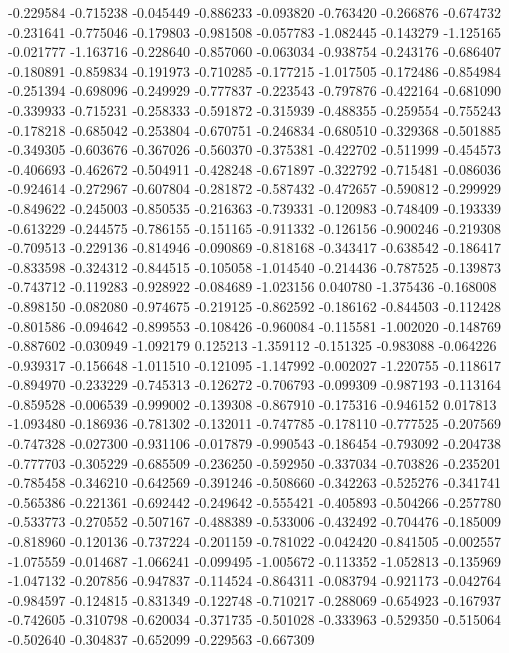 -0.229584
-0.715238
-0.045449
-0.886233
-0.093820
-0.763420
-0.266876
-0.674732
-0.231641
-0.775046
-0.179803
-0.981508
-0.057783
-1.082445
-0.143279
-1.125165
-0.021777
-1.163716
-0.228640
-0.857060
-0.063034
-0.938754
-0.243176
-0.686407
-0.180891
-0.859834
-0.191973
-0.710285
-0.177215
-1.017505
-0.172486
-0.854984
-0.251394
-0.698096
-0.249929
-0.777837
-0.223543
-0.797876
-0.422164
-0.681090
-0.339933
-0.715231
-0.258333
-0.591872
-0.315939
-0.488355
-0.259554
-0.755243
-0.178218
-0.685042
-0.253804
-0.670751
-0.246834
-0.680510
-0.329368
-0.501885
-0.349305
-0.603676
-0.367026
-0.560370
-0.375381
-0.422702
-0.511999
-0.454573
-0.406693
-0.462672
-0.504911
-0.428248
-0.671897
-0.322792
-0.715481
-0.086036
-0.924614
-0.272967
-0.607804
-0.281872
-0.587432
-0.472657
-0.590812
-0.299929
-0.849622
-0.245003
-0.850535
-0.216363
-0.739331
-0.120983
-0.748409
-0.193339
-0.613229
-0.244575
-0.786155
-0.151165
-0.911332
-0.126156
-0.900246
-0.219308
-0.709513
-0.229136
-0.814946
-0.090869
-0.818168
-0.343417
-0.638542
-0.186417
-0.833598
-0.324312
-0.844515
-0.105058
-1.014540
-0.214436
-0.787525
-0.139873
-0.743712
-0.119283
-0.928922
-0.084689
-1.023156
0.040780
-1.375436
-0.168008
-0.898150
-0.082080
-0.974675
-0.219125
-0.862592
-0.186162
-0.844503
-0.112428
-0.801586
-0.094642
-0.899553
-0.108426
-0.960084
-0.115581
-1.002020
-0.148769
-0.887602
-0.030949
-1.092179
0.125213
-1.359112
-0.151325
-0.983088
-0.064226
-0.939317
-0.156648
-1.011510
-0.121095
-1.147992
-0.002027
-1.220755
-0.118617
-0.894970
-0.233229
-0.745313
-0.126272
-0.706793
-0.099309
-0.987193
-0.113164
-0.859528
-0.006539
-0.999002
-0.139308
-0.867910
-0.175316
-0.946152
0.017813
-1.093480
-0.186936
-0.781302
-0.132011
-0.747785
-0.178110
-0.777525
-0.207569
-0.747328
-0.027300
-0.931106
-0.017879
-0.990543
-0.186454
-0.793092
-0.204738
-0.777703
-0.305229
-0.685509
-0.236250
-0.592950
-0.337034
-0.703826
-0.235201
-0.785458
-0.346210
-0.642569
-0.391246
-0.508660
-0.342263
-0.525276
-0.341741
-0.565386
-0.221361
-0.692442
-0.249642
-0.555421
-0.405893
-0.504266
-0.257780
-0.533773
-0.270552
-0.507167
-0.488389
-0.533006
-0.432492
-0.704476
-0.185009
-0.818960
-0.120136
-0.737224
-0.201159
-0.781022
-0.042420
-0.841505
-0.002557
-1.075559
-0.014687
-1.066241
-0.099495
-1.005672
-0.113352
-1.052813
-0.135969
-1.047132
-0.207856
-0.947837
-0.114524
-0.864311
-0.083794
-0.921173
-0.042764
-0.984597
-0.124815
-0.831349
-0.122748
-0.710217
-0.288069
-0.654923
-0.167937
-0.742605
-0.310798
-0.620034
-0.371735
-0.501028
-0.333963
-0.529350
-0.515064
-0.502640
-0.304837
-0.652099
-0.229563
-0.667309
